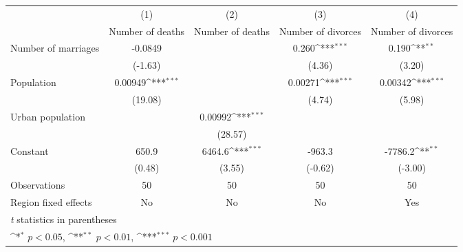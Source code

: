 {
\def\sym#1{\ifmmode^{#1}\else\(^{#1}\)\fi}
\begin{tabular}{l*{4}{c}}
\hline\hline
                    &\multicolumn{1}{c}{(1)}&\multicolumn{1}{c}{(2)}&\multicolumn{1}{c}{(3)}&\multicolumn{1}{c}{(4)}\\
                    &\multicolumn{1}{c}{Number of deaths}&\multicolumn{1}{c}{Number of deaths}&\multicolumn{1}{c}{Number of divorces}&\multicolumn{1}{c}{Number of divorces}\\
\hline
Number of marriages &     -0.0849         &                     &       0.260\sym{***}&       0.190\sym{**} \\
                    &     (-1.63)         &                     &      (4.36)         &      (3.20)         \\
[1em]
Population          &     0.00949\sym{***}&                     &     0.00271\sym{***}&     0.00342\sym{***}\\
                    &     (19.08)         &                     &      (4.74)         &      (5.98)         \\
[1em]
Urban population    &                     &     0.00992\sym{***}&                     &                     \\
                    &                     &     (28.57)         &                     &                     \\
[1em]
Constant            &       650.9         &      6464.6\sym{***}&      -963.3         &     -7786.2\sym{**} \\
                    &      (0.48)         &      (3.55)         &     (-0.62)         &     (-3.00)         \\
\hline
Observations        &          50         &          50         &          50         &          50         \\
Region fixed effects&          No         &          No         &          No         &         Yes         \\
\hline\hline
\multicolumn{5}{l}{\footnotesize \textit{t} statistics in parentheses}\\
\multicolumn{5}{l}{\footnotesize \sym{*} \(p<0.05\), \sym{**} \(p<0.01\), \sym{***} \(p<0.001\)}\\
\end{tabular}
}

